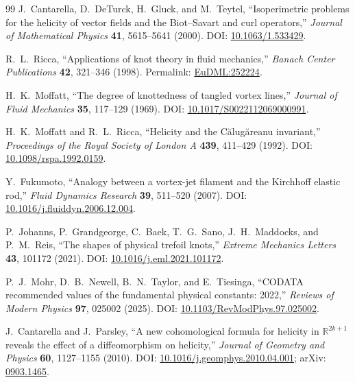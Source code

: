 \begin{thebibliography}{99}
J.~Cantarella, D.~DeTurck, H.~Gluck, and M.~Teytel,
``Isoperimetric problems for the helicity of vector fields and the Biot--Savart and curl operators,''
\emph{Journal of Mathematical Physics} \textbf{41}, 5615--5641 (2000).
DOI: \href{https://doi.org/10.1063/1.533429}{10.1063/1.533429}.


R.~L.~Ricca,
``Applications of knot theory in fluid mechanics,''
\emph{Banach Center Publications} \textbf{42}, 321--346 (1998).
Permalink: \href{https://eudml.org/doc/252224}{EuDML:252224}.

H.~K.~Moffatt,
``The degree of knottedness of tangled vortex lines,''
\emph{Journal of Fluid Mechanics} \textbf{35}, 117--129 (1969).
DOI: \href{https://doi.org/10.1017/S0022112069000991}{10.1017/S0022112069000991}.


H.~K.~Moffatt and R.~L.~Ricca,
``Helicity and the C\u{a}lug\u{a}reanu invariant,''
\emph{Proceedings of the Royal Society of London A} \textbf{439}, 411--429 (1992).
DOI: \href{https://doi.org/10.1098/rspa.1992.0159}{10.1098/rspa.1992.0159}.

Y.~Fukumoto,
``Analogy between a vortex-jet filament and the Kirchhoff elastic rod,''
\emph{Fluid Dynamics Research} \textbf{39}, 511--520 (2007).
DOI: \href{https://doi.org/10.1016/j.fluiddyn.2006.12.004}{10.1016/j.fluiddyn.2006.12.004}.

P.~Johanns, P.~Grandgeorge, C.~Baek, T.~G.~Sano,
J.~H.~Maddocks, and P.~M.~Reis,
``The shapes of physical trefoil knots,''
\emph{Extreme Mechanics Letters} \textbf{43}, 101172 (2021).
DOI: \href{https://doi.org/10.1016/j.eml.2021.101172}{10.1016/j.eml.2021.101172}.

P.~J.~Mohr, D.~B.~Newell, B.~N.~Taylor, and E.~Tiesinga,
``CODATA recommended values of the fundamental physical constants: 2022,''
\emph{Reviews of Modern Physics} \textbf{97}, 025002 (2025).
DOI: \href{https://doi.org/10.1103/RevModPhys.97.025002}{10.1103/RevModPhys.97.025002}.

J.~Cantarella and J.~Parsley,
``A new cohomological formula for helicity in $\mathbb R^{2k+1}$ reveals the effect of a diffeomorphism on helicity,''
\emph{Journal of Geometry and Physics} \textbf{60}, 1127--1155 (2010).
DOI: \href{https://doi.org/10.1016/j.geomphys.2010.04.001}{10.1016/j.geomphys.2010.04.001};
arXiv: \href{https://arxiv.org/abs/0903.1465}{0903.1465}.


\end{thebibliography}
